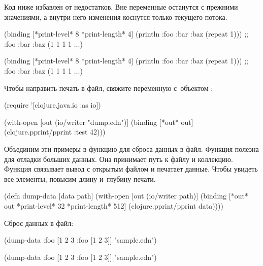 Код ниже избавлен от недостатков. Вне  переменные останутся с
прежними значениями, а внутри него изменения коснутся только текущего потока.

\ifnarrow

\begin{clojure}
(binding [*print-level* 8
          *print-length* 4]
  (println
    {:foo {:bar {:baz (repeat 1)}}}))
;; {:foo {:bar {:baz (1 1 1 1 ...)}}}
\end{clojure}

\else

\begin{clojure}
(binding [*print-level* 8
          *print-length* 4]
  (println {:foo {:bar {:baz (repeat 1)}}}))
;; {:foo {:bar {:baz (1 1 1 1 ...)}}}
\end{clojure}

\fi


Чтобы направить печать в файл, свяжите переменную  с~объектом
:

\begin{clojure}
(require '[clojure.java.io :as io])

(with-open [out (io/writer "dump.edn")]
  (binding [*out* out]
    (clojure.pprint/pprint {:test 42})))
\end{clojure}

Объединим эти примеры в функцию для сброса данных в файл. Функция полезна для
отладки больших данных. Она принимает путь к файлу и коллекцию. Функция
связывает вывод с открытым файлом и печатает данные. Чтобы увидеть все элементы,
повысим длину и~глубину печати.

\begin{clojure}
(defn dump-data
  [data path]
  (with-open [out (io/writer path)]
    (binding [*out* out
              *print-level* 32
              *print-length* 512]
      (clojure.pprint/pprint data))))
\end{clojure}

\noindent
Сброс данных в файл:

\ifnarrow

\begin{clojure}
(dump-data
  {:foo [1 2 3 {:foo [1 2 3]}]}
  "sample.edn")
\end{clojure}

\else

\begin{clojure}
(dump-data {:foo [1 2 3 {:foo [1 2 3]}]} "sample.edn")
\end{clojure}

